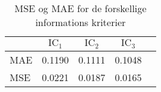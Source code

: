 \begin{table}
\center
\begin{tabular}{lcccc}
\toprule
& $\text{IC}_1$ & $\text{IC}_2$ & $\text{IC}_3$ \\
\midrule 
MAE & 0.1190 & 0.1111 & 0.1048  \\ 
MSE &  0.0221  & 0.0187  & 0.0165 \\ \bottomrule
 \end{tabular}
\caption{MSE og MAE for de forskellige informations kriterier} \label{tab:factor_mse_tab}
\end{table}